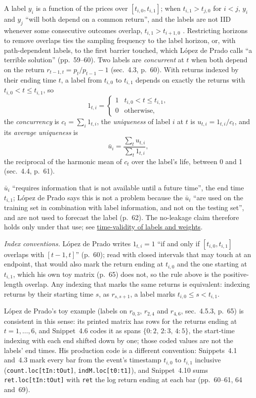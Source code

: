 \begin{qfdefinition}\label{def:label-concurrency-uniqueness}
 A label $y_i$ is a function of the prices over $[t_{i,0},t_{i,1}]$; when $t_{i,1}>t_{j,0}$ for $i<j$, $y_i$ and $y_j$ ``will both depend on a common return'', and the labels are not IID whenever some consecutive outcomes overlap, $t_{i,1}>t_{i+1,0}$ \citep[chap.~4, sec.~4.2, p.~59]{alpha-afml}. Restricting horizons to remove overlaps ties the sampling frequency to the label horizon, or, with path-dependent labels, to the first barrier touched, which López de Prado calls ``a terrible solution'' (pp.~59--60). Two labels are \emph{concurrent} at $t$ when both depend on the return $r_{t-1,t}=p_t/p_{t-1}-1$ (sec.~4.3, p.~60). With returns indexed by their ending time $t$, a label from $t_{i,0}$ to $t_{i,1}$ depends on exactly the returns with $t_{i,0}<t\le t_{i,1}$, so
\[ 1_{t,i}=\begin{cases}1&t_{i,0}<t\le t_{i,1},\\0&\text{otherwise,}\end{cases} \]
the \emph{concurrency} is $c_t=\sum_i1_{t,i}$, the \emph{uniqueness} of label $i$ at $t$ is $u_{t,i}=1_{t,i}/c_t$, and its \emph{average uniqueness} is
\[ \bar u_i=\frac{\sum_tu_{t,i}}{\sum_t1_{t,i}}, \]
the reciprocal of the harmonic mean of $c_t$ over the label's life, between 0 and 1 (sec.~4.4, p.~61).

 $\bar u_i$ ``requires information that is not available until a future time'', the end time $t_{i,1}$; López de Prado says this is not a problem because the $\bar u_i$ ``are used on the training set in combination with label information, and not on the testing set'', and are not used to forecast the label (p.~62). The no-leakage claim therefore holds only under that use; see \hyperref[pit:label-weight-leakage]{time-validity of labels and weights}.

\emph{Index conventions.} López de Prado writes $1_{t,i}=1$ ``if and only if $[t_{i,0},t_{i,1}]$ overlaps with $[t-1,t]$'' (p.~60); read with closed intervals that may touch at an endpoint, that would also mark the return ending at $t_{i,0}$ and the one starting at $t_{i,1}$, which his own toy matrix (p.~65) does not, so the rule above is the positive-length overlap. Any indexing that marks the same returns is equivalent: indexing returns by their starting time $s$, as $r_{s,s+1}$, a label marks $t_{i,0}\le s<t_{i,1}$.

López de Prado's toy example (labels on $r_{0,3}$, $r_{2,4}$ and $r_{4,6}$, sec.~4.5.3, p.~65) is consistent in this sense: its printed matrix has rows for the returns ending at $t=1,\dots,6$, and Snippet~4.6 codes it as spans $\{0{:}2,\,2{:}3,\,4{:}5\}$, the start-time indexing with each end shifted down by one; those coded values are not the labels' end times. His production code is a different convention: Snippets~4.1 and~4.3 mark every bar from the event's timestamp $t_{i,0}$ to $t_{i,1}$ inclusive (\texttt{count.loc[tIn:tOut]}, \texttt{indM.loc[t0:t1]}), and Snippet~4.10 sums \texttt{ret.loc[tIn:tOut]} with \texttt{ret} the log return ending at each bar (pp.~60--61, 64 and~69).


\end{qfdefinition}
